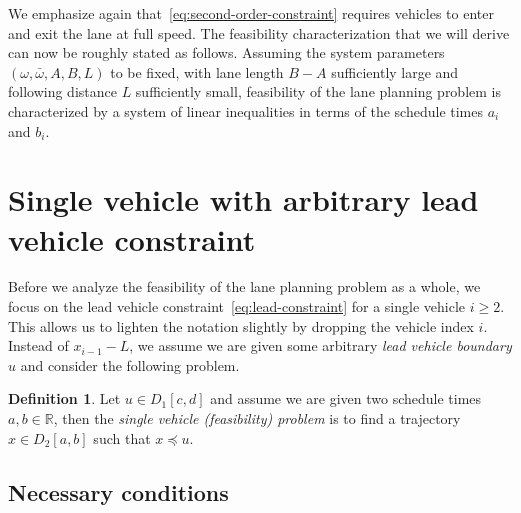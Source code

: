 \documentclass[a4paper]{report}
\theoremstyle{definition}
\newtheorem{define}{Definition}[chapter]
\theoremstyle{plain}
\begin{document}
We emphasize again that~\eqref{eq:second-order-constraint} requires vehicles to
enter and exit the lane at full speed.
%
The feasibility characterization that we will derive can now be roughly stated
as follows. Assuming the system parameters $(\omega, \bar{\omega},A,B,L)$ to be
fixed, with lane length $B-A$ sufficiently large and following distance $L$
sufficiently small, feasibility of the lane planning problem is characterized by
a system of linear inequalities in terms of the schedule times $a_{i}$ and
$b_{i}$.



\section{Single vehicle with arbitrary lead vehicle constraint}\label{sec:single-vehicle-problem}

Before we analyze the feasibility of the lane planning problem as a whole, we
focus on the lead vehicle constraint~\eqref{eq:lead-constraint} for a single
vehicle $i \geq 2$.
%
This allows us to lighten the notation slightly by dropping the vehicle index
$i$. Instead of $x_{i-1} - L$, we assume we are given some arbitrary \emph{lead vehicle boundary}
$u$ and consider the following problem.

\begin{define}
  Let $u \in D_{1}[c, d]$ and assume we are given two schedule times
  $a,b \in \mathbb{R}$, then the \emph{single vehicle (feasibility) problem} is to find
  a trajectory $x \in D_{2}[a,b]$ such that $x \preceq u$.
\end{define}

\subsection{Necessary conditions}
\end{document}
